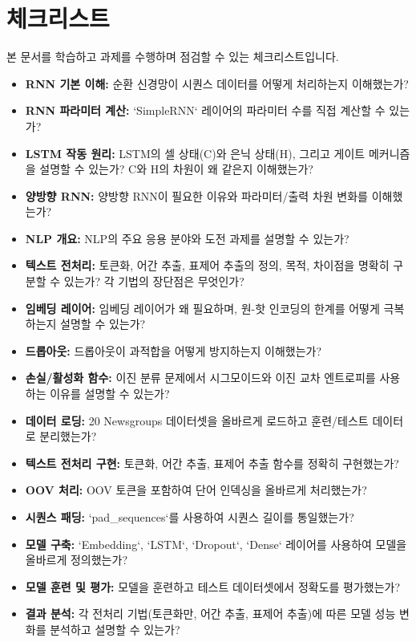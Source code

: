 \documentclass[11pt,a4paper]{article}
\begin{document}
\newpage
\section*{체크리스트}
본 문서를 학습하고 과제를 수행하며 점검할 수 있는 체크리스트입니다.

\begin{tcolorbox}[title=\textbf{학습 점검 체크리스트}, colback=mygreen!5!white, colframe=mygreen!75!black]
\begin{itemize}
    \item \textbf{RNN 기본 이해:} 순환 신경망이 시퀀스 데이터를 어떻게 처리하는지 이해했는가?
    \item \textbf{RNN 파라미터 계산:} `SimpleRNN` 레이어의 파라미터 수를 직접 계산할 수 있는가?
    \item \textbf{LSTM 작동 원리:} LSTM의 셀 상태(C)와 은닉 상태(H), 그리고 게이트 메커니즘을 설명할 수 있는가? C와 H의 차원이 왜 같은지 이해했는가?
    \item \textbf{양방향 RNN:} 양방향 RNN이 필요한 이유와 파라미터/출력 차원 변화를 이해했는가?
    \item \textbf{NLP 개요:} NLP의 주요 응용 분야와 도전 과제를 설명할 수 있는가?
    \item \textbf{텍스트 전처리:} 토큰화, 어간 추출, 표제어 추출의 정의, 목적, 차이점을 명확히 구분할 수 있는가? 각 기법의 장단점은 무엇인가?
    \item \textbf{임베딩 레이어:} 임베딩 레이어가 왜 필요하며, 원-핫 인코딩의 한계를 어떻게 극복하는지 설명할 수 있는가?
    \item \textbf{드롭아웃:} 드롭아웃이 과적합을 어떻게 방지하는지 이해했는가?
    \item \textbf{손실/활성화 함수:} 이진 분류 문제에서 시그모이드와 이진 교차 엔트로피를 사용하는 이유를 설명할 수 있는가?
\end{itemize}
\end{tcolorbox}

\begin{tcolorbox}[title=\textbf{과제 수행 체크리스트}, colback=myblue!5!white, colframe=myblue!75!black]
\begin{itemize}
    \item \textbf{데이터 로딩:} 20 Newsgroups 데이터셋을 올바르게 로드하고 훈련/테스트 데이터로 분리했는가?
    \item \textbf{텍스트 전처리 구현:} 토큰화, 어간 추출, 표제어 추출 함수를 정확히 구현했는가?
    \item \textbf{OOV 처리:} OOV 토큰을 포함하여 단어 인덱싱을 올바르게 처리했는가?
    \item \textbf{시퀀스 패딩:} `pad_sequences`를 사용하여 시퀀스 길이를 통일했는가?
    \item \textbf{모델 구축:} `Embedding`, `LSTM`, `Dropout`, `Dense` 레이어를 사용하여 모델을 올바르게 정의했는가?
    \item \textbf{모델 훈련 및 평가:} 모델을 훈련하고 테스트 데이터셋에서 정확도를 평가했는가?
    \item \textbf{결과 분석:} 각 전처리 기법(토큰화만, 어간 추출, 표제어 추출)에 따른 모델 성능 변화를 분석하고 설명할 수 있는가?
\end{itemize}
\end{tcolorbox}
\end{document}
